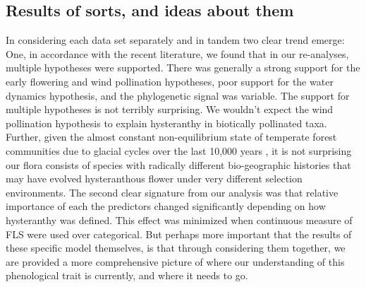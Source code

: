 \documentclass[12pt]{article}\usepackage[]{graphicx}\usepackage[]{color}
\begin{document}
\subsection*{Results of sorts, and ideas about them}
\indent\indent In considering each data set separately and in tandem two clear trend emerge: One, in accordance with the recent literature, we found that in our re-analyses, multiple hypotheses were supported. There was generally a strong support for the early flowering and wind pollination hypotheses, poor support for the water dynamics hypothesis, and the phylogenetic signal was variable. The support for multiple hypotheses is not terribly surprising. We wouldn't expect the wind pollination hypothesis to explain hysteranthy in biotically pollinated taxa. Further, given the almost constant non-equilibrium state of temperate forest communities due to glacial cycles over the last 10,000 years \citep{Spurr1980}, it is not surprising our flora consists of species with radically different bio-geographic histories that may have evolved hysteranthous flower under very different selection environments.  The second clear signature from our analysis was that relative importance of each the predictors changed significantly depending on how hysteranthy was defined. This effect was minimized when continuous measure of FLS were used over categorical. But perhaps more important that the results of these specific model themselves, is that through considering them together, we are provided a more comprehensive picture of where our understanding of this phenological trait is currently, and where it needs to go. 
\end{document}
